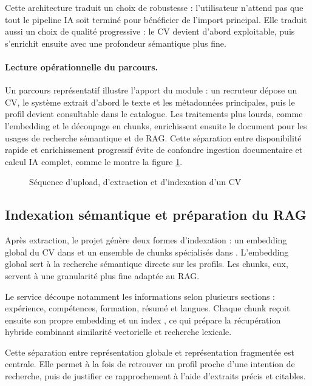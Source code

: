 Cette architecture traduit un choix de robustesse : l'utilisateur n'attend pas que tout le pipeline IA soit terminé pour bénéficier de l'import principal. Elle traduit aussi un choix de qualité progressive : le CV devient d'abord exploitable, puis s'enrichit ensuite avec une profondeur sémantique plus fine.

\paragraph{Lecture opérationnelle du parcours.}
Un parcours représentatif illustre l'apport du module : un recruteur dépose un CV, le système extrait d'abord le texte et les métadonnées principales, puis le profil devient consultable dans le catalogue. Les traitements plus lourds, comme l'embedding et le découpage en chunks, enrichissent ensuite le document pour les usages de recherche sémantique et de RAG. Cette séparation entre disponibilité rapide et enrichissement progressif évite de confondre ingestion documentaire et calcul IA complet, comme le montre la figure \ref{fig:cv-upload-pipeline}.

\begin{figure}[H]
  \centering
  \caption{\label{fig:cv-upload-pipeline}Séquence d'upload, d'extraction et d'indexation d'un CV}
\end{figure}

\subsection{Indexation sémantique et préparation du RAG}
Après extraction, le projet génère deux formes d'indexation : un embedding global du CV dans  et un ensemble de chunks spécialisés dans . L'embedding global sert à la recherche sémantique directe sur les profils. Les chunks, eux, servent à une granularité plus fine adaptée au RAG.

Le service  découpe notamment les informations selon plusieurs sections : expérience, compétences, formation, résumé et langues. Chaque chunk reçoit ensuite son propre embedding et un index , ce qui prépare la récupération hybride combinant similarité vectorielle et recherche lexicale.

Cette séparation entre représentation globale et représentation fragmentée est centrale. Elle permet à la fois de retrouver un profil proche d'une intention de recherche, puis de justifier ce rapprochement à l'aide d'extraits précis et citables.

